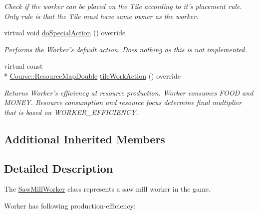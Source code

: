 \begin{DoxyCompactItemize}
\begin{DoxyCompactList}\small\item\em Check if the worker can be placed on the Tile according to it's placement rule. Only rule is that the Tile must have same owner as the worker. \end{DoxyCompactList}\item 
virtual void \hyperlink{classGame_1_1SawMillWorker_af344bff415417cb0c2744b038872221a}{do\-Special\-Action} () override
\begin{DoxyCompactList}\small\item\em Performs the Worker's default action. Does nothing as this is not implemented. \end{DoxyCompactList}\item 
virtual const \\*
\hyperlink{namespaceCourse_a0b96bae1a664dde34efbb1b42dea615e}{Course\-::\-Resource\-Map\-Double} \hyperlink{classGame_1_1SawMillWorker_a51596a8864954a22c6b69303b5e408d8}{tile\-Work\-Action} () override
\begin{DoxyCompactList}\small\item\em Returns Worker's efficiency at resource production. Worker consumes F\-O\-O\-D and M\-O\-N\-E\-Y. Resource consumption and resource focus determine final multiplier that is based on W\-O\-R\-K\-E\-R\-\_\-\-E\-F\-F\-I\-C\-I\-E\-N\-C\-Y. \end{DoxyCompactList}\end{DoxyCompactItemize}
\subsection*{Additional Inherited Members}


\subsection{Detailed Description}
The \hyperlink{classGame_1_1SawMillWorker}{Saw\-Mill\-Worker} class represents a saw mill worker in the game. 

Worker has following production-\/efficiency\-: \par

